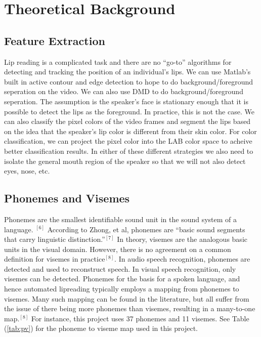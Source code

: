 \documentclass[a4paper,11pt]{article}
\begin{document}
 





\section{Theoretical Background}
\label{sec:theory}
\subsection{Feature Extraction}
Lip reading is a complicated task and there are no ``go-to'' algorithms for detecting and tracking the position of an individual's lips. We can use Matlab's built in active contour and edge detection to hope to do background/foreground seperation on the video. We can also use DMD to do background/foreground seperation. The assumption is the speaker's face is stationary enough that it is possible to detect the lips as the foreground. In practice, this is not the case. We can also classify the pixel colors of the video frames and segment the lips based on the idea that the speaker's lip color is different from their skin color. For color classification, we can project the pixel color into the LAB color space to acheive better classification results. In either of these different strategies we also need to isolate the general mouth region of the speaker so that we will not also detect eyes, nose, etc.
\subsection{Phonemes and Visemes}
Phonemes are the smallest identifiable sound unit in the sound system of a language. $^{[6]}$  According to Zhong, et al, phonemes are ``basic sound segments that carry linguistic distinction.''$^{[7]}$ In theory, visemes are the analogous basic units in the visual domain.  However, there is no agreement on a common definition for visemes in practice$^{[8]}$.  In audio speech recognition, phonemes are detected and used to reconstruct speech.  In visual speech recognition, only visemes can be detected.  Phonemes for the basis for a spoken language, and hence automated lipreading typically employs a mapping from phonemes to visemes.  Many such mapping can be found in the literature, but all suffer from the issue of there being more phonemes than visemes, resulting in a many-to-one map.$^{[8]}$  For instance, this project uses 37 phonemes and 11 visemes. See Table (\ref{tab:pv}) for the phoneme to viseme map used in this project.  
\end{document}
